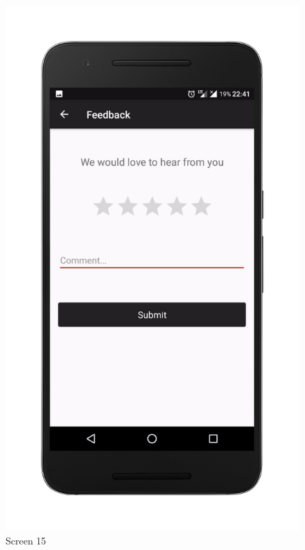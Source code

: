 \newpage
\begin{figure}[ht]
\centering
\includegraphics[scale=0.13]{images/f.png}
\caption{Screen 15}
\end{figure}

